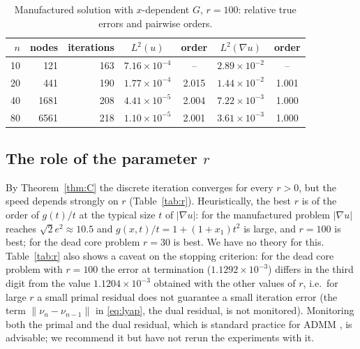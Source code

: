 \documentclass[11pt]{amsart}
\theoremstyle{definition}
\theoremstyle{remark}
\numberwithin{equation}{section}
\newcommand{\abs}[1]{\lvert #1\rvert}
\newcommand{\norm}[1]{\lVert #1\rVert}
\begin{document}
\begin{table}[t]
\caption{Manufactured solution with $x$-dependent $G$, $r=100$: relative true errors and pairwise orders.}\label{tab:manufactured}
\small
\begin{tabular}{@{}rrrcccc@{}}
\toprule
$n$ & nodes & iterations & $L^2(u)$ & order & $L^2(\nabla u)$ & order\\
\midrule
10 & 121 & 163 & $7.16\times10^{-4}$ & -- & $2.89\times10^{-2}$ & --\\
20 & 441 & 190 & $1.77\times10^{-4}$ & 2.015 & $1.44\times10^{-2}$ & 1.001\\
40 & 1681 & 208 & $4.41\times10^{-5}$ & 2.004 & $7.22\times10^{-3}$ & 1.000\\
80 & 6561 & 218 & $1.10\times10^{-5}$ & 2.001 & $3.61\times10^{-3}$ & 1.000\\
\bottomrule
\end{tabular}
\end{table}

\subsection{\texorpdfstring{The role of the parameter $r$}{The role of the parameter r}}\label{ssec:r}
By Theorem~\ref{thm:C} the discrete iteration converges for every $r>0$, but the speed depends strongly on $r$ (Table~\ref{tab:r}). Heuristically, the best $r$ is of the order of $g(t)/t$ at the typical size $t$ of $\abs{\nabla u}$: for the manufactured problem $\abs{\nabla u}$ reaches $\sqrt2e^2\approx10.5$ and $g(x,t)/t=1+(1+x_1)t^2$ is large, and $r=100$ is best; for the dead core problem $r=30$ is best. We have no theory for this. Table~\ref{tab:r} also shows a caveat on the stopping criterion: for the dead core problem with $r=100$ the error at termination ($1.1292\times10^{-3}$) differs in the third digit from the value $1.1204\times10^{-3}$ obtained with the other values of $r$, i.e.\ for large $r$ a small primal residual does not guarantee a small iteration error (the term $\norm{\nu_n-\nu_{n-1}}$ in \eqref{eq:lyap}, the dual residual, is not monitored). Monitoring both the primal and the dual residual, which is standard practice for ADMM \cite{Boyd2011ADMM}, is advisable; we recommend it but have not rerun the experiments with it.
\end{document}

